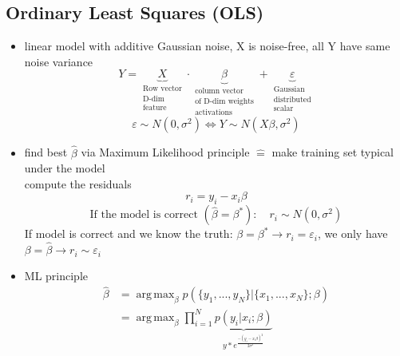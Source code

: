 \documentclass[11pt]{article}
\DeclareMathOperator*{\argmax}{arg\,max}
\begin{document}
    \subsection{Ordinary Least Squares (OLS)}
      \begin{itemize}
        \item linear model with additive Gaussian noise, X is noise-free,
        all Y have same noise variance
        \begin{equation*}
          Y = \underbrace{X}_{\substack{\text{Row vector} \\
          \text{D-dim} \\ \text{feature}}} \cdot \underbrace
          {\beta}_{\substack{\text{column vector} \\
          \text{of D-dim weights} \\ \text{activations}}} +
          \underbrace{\varepsilon}_{\substack{\text{Gaussian} \\
          \text{distributed} \\ \text{scalar}}}
        \end{equation*}
        \begin{equation*}
          \varepsilon \sim N(0, \sigma^2) \iff Y \sim N(X\beta, \sigma^2)
        \end{equation*}
        \item find best $\hat{\beta}$ via Maximum Likelihood principle $\hat{=}$
        make training set typical under the model \\
        compute the residuals
        \begin{equation*}
          r_i = y_i - x_i\beta
        \end{equation*}
        \begin{equation*}
          \text{If the model is correct } (\hat{\beta}=\beta^*):\quad r_i \sim N(0, \sigma^2)
        \end{equation*}
        If model is correct and we know the truth:  $\beta = \beta^* \rightarrow r_i =
        \varepsilon_i$, we only have $\beta = \hat{\beta} \rightarrow r_i \sim \varepsilon_i$
        \item ML principle
        \begin{equation*}
          \begin{align*}
            \hat{\beta}&= \argmax_{\beta} p(\{ y_1,...,y_N\} |\{ x_1,...,x_N\};\beta) \\
            &= \argmax_{\beta} \prod_{i=1}^{N} \underbrace{p(y_i|x_i;\beta)}_{
            y*e^{\frac{-(y_i-x_i\beta)^2}{2\sigma^2}}}

\end{align*}
\end{equation*}
\end{itemize}
\end{document}

